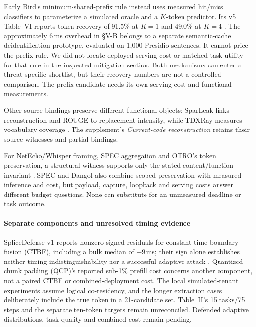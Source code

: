 Early Bird's minimum-shared-prefix rule instead uses measured hit/miss classifiers to parameterize a simulated oracle and a $K$-token predictor. Its v5 Table~VI reports token recovery of 91.5\% at $K=1$ and 49.0\% at $K=4$ \cite[V-A]{earlybird2025}. The approximately 6\,ms overhead in \S V-B belongs to a separate semantic-cache deidentification prototype, evaluated on 1,000 Presidio sentences. It cannot price the prefix rule. We did not locate deployed-serving cost or matched task utility for that rule in the inspected mitigation section. Both mechanisms can enter a threat-specific shortlist, but their recovery numbers are not a controlled comparison. The prefix candidate needs its own serving-cost and functional measurements.

Other source bindings preserve different functional objects: SparLeak links reconstruction and ROUGE to replacement intensity, while TDXRay measures vocabulary coverage \cite{chen2026sparleak,hornetz2026tdxray}. The supplement's \emph{Current-code reconstruction} retains their source witnesses and partial bindings.

For NetEcho/Whisper framing, SPEC aggregation and OTRO's token preservation, a structural witness supports only the stated content/function invariant \cite{netecho2025,whisperleak2025,wei2024speculation,lee2026otro}. SPEC and Dangol also combine scoped preservation with measured inference and cost, but payload, capture, loopback and serving costs answer different budget questions. None can substitute for an unmeasured deadline or task outcome.

\paragraph{Separate components and unresolved timing evidence}
SpliceDefense v1 reports nonzero signed residuals for constant-time boundary fusion (CTBF), including a bulk median of $-9$\,ms; their sign alone establishes neither timing indistinguishability nor a successful adaptive attack \cite[VII-C, Table~II]{spliceleak2026}. Quantized chunk padding (QCP)'s reported sub-1\% prefill cost concerns another component, not a paired CTBF or combined-deployment cost. The local simulated-tenant experiments assume logical co-residency, and the longer extraction cases deliberately include the true token in a 21-candidate set. Table~II's 15 tasks/75 steps and the separate ten-token targets remain unreconciled. Defended adaptive distributions, task quality and combined cost remain pending.

